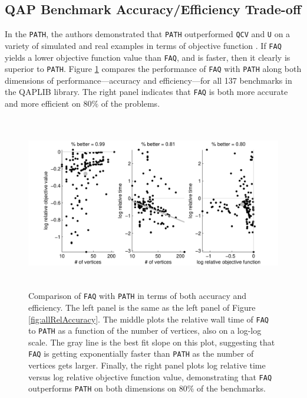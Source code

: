 \documentclass[11pt]{article}
\newcommand{\FAQ}{\texttt{FAQ} }
\begin{document}

\subsection{QAP Benchmark Accuracy/Efficiency Trade-off} %
\label{sub:qap_benchmark_accuracy_efficiency_trade_off}

In the \texttt{PATH}, the authors demonstrated that \texttt{PATH} outperformed \texttt{QCV} and \texttt{U} on a variety of simulated and real examples in terms of objective function \cite{Zaslavskiy2009}.  If \FAQ yields a lower objective function value than \texttt{FAQ}, and is faster, then it clearly is superior to \texttt{PATH}.  Figure \ref{fig:tradeoff} compares the performance of \FAQ with \texttt{PATH} along both dimensions of performance---accuracy and efficiency---for all 137 benchmarks in the QAPLIB library.  The right panel indicates that \FAQ is both more accurate and more efficient on $80\%$ of the problems.

\begin{figure}[htbp]
	\centering
		\includegraphics[height=3in]{allPathCompare.pdf}
	\caption{Comparison of \FAQ with \texttt{PATH} in terms of both accuracy and efficiency.  The left panel is the same as the left panel of Figure \ref{fig:allRelAccuracy}.  The middle plots the relative wall time of \FAQ to \texttt{PATH} as a function of the number of vertices, also on a log-log scale.  The gray line is the best fit slope on this plot, suggesting that \FAQ is getting exponentially faster than \texttt{PATH} as the number of vertices gets larger.  Finally, the right panel plots log relative time versus log relative objective function value, demonstrating that \FAQ outperforms \texttt{PATH} on both dimensions on $80\%$ of the benchmarks.}
	\label{fig:tradeoff}
\end{figure}
\end{document}
